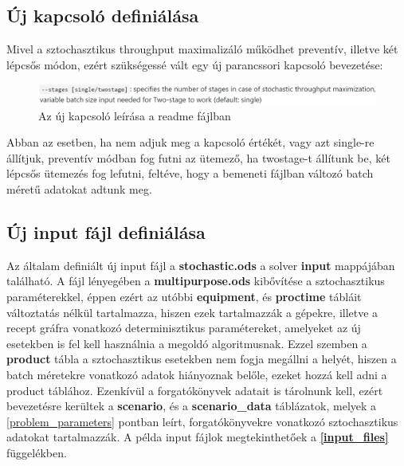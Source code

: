 \subsection{Új kapcsoló definiálása}
Mivel a sztochasztikus throughput maximalizáló működhet preventív, illetve két lépcsős módon, ezért szükségessé vált egy új parancssori kapcsoló bevezetése:
\begin{figure}[H]
\begin{center}
\includegraphics[scale=0.4]{switch}
\caption{Az új kapcsoló leírása a readme fájlban}
\label{switch}
\end{center}
\end{figure}
Abban az esetben, ha nem adjuk meg a kapcsoló értékét, vagy azt single-re állítjuk, preventív módban fog futni az ütemező, ha twostage-t állítunk be, két lépcsős ütemezés fog lefutni, feltéve, hogy a bemeneti fájlban változó batch méretű adatokat adtunk meg.
\subsection{Új input fájl definiálása}
Az általam definiált új input fájl a \textbf{stochastic.ods} a solver \textbf{input} mappájában található. A fájl lényegében a \textbf{multipurpose.ods} kibővítése a sztochasztikus paraméterekkel, éppen ezért az utóbbi \textbf{equipment}, és \textbf{proctime} tábláit változtatás nélkül tartalmazza, hiszen ezek tartalmazzák a gépekre, illetve a recept gráfra vonatkozó determinisztikus paramétereket, amelyeket az új esetekben is fel kell használnia a megoldó algoritmusnak. Ezzel szemben a \textbf{product} tábla a sztochasztikus esetekben nem fogja megállni a helyét, hiszen a batch méretekre vonatkozó adatok hiányoznak belőle, ezeket hozzá kell adni a product táblához. Ezenkívül a forgatókönyvek adatait is tárolnunk kell, ezért bevezetésre kerültek a\textbf{ scenario}, és a \textbf{scenario\_data} táblázatok, melyek a \ref{problem_parameters} pontban leírt, forgatókönyvekre vonatkozó sztochasztikus adatokat tartalmazzák. A példa input fájlok megtekinthetőek a \textbf{\ref{input_files}} függelékben.
